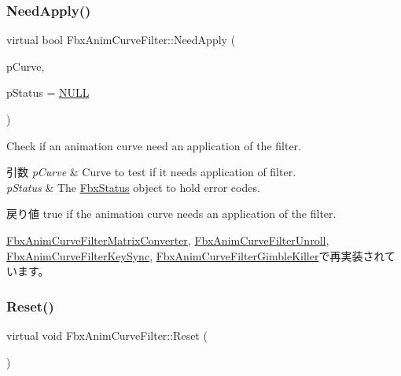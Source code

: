 \subsubsection{\texorpdfstring{Need\+Apply()}{NeedApply()}\hspace{0.1cm}{\footnotesize\ttfamily [5/5]}}
{\footnotesize\ttfamily virtual bool Fbx\+Anim\+Curve\+Filter\+::\+Need\+Apply (\begin{DoxyParamCaption}\item[{\hyperlink{class_fbx_anim_curve}{Fbx\+Anim\+Curve} \&}]{p\+Curve,  }\item[{\hyperlink{class_fbx_status}{Fbx\+Status} $\ast$}]{p\+Status = {\ttfamily \hyperlink{fbxarch_8h_a070d2ce7b6bb7e5c05602aa8c308d0c4}{N\+U\+LL}} }\end{DoxyParamCaption})\hspace{0.3cm}{\ttfamily [virtual]}}

Check if an animation curve need an application of the filter. 
\begin{DoxyParams}{引数}
{\em p\+Curve} & Curve to test if it needs application of filter. \\
\hline
{\em p\+Status} & The \hyperlink{class_fbx_status}{Fbx\+Status} object to hold error codes. \\
\hline
\end{DoxyParams}
\begin{DoxyReturn}{戻り値}
{\ttfamily true} if the animation curve needs an application of the filter. 
\end{DoxyReturn}


\hyperlink{class_fbx_anim_curve_filter_matrix_converter_aa7105a07dbaf0d9598fa930ff2b3141d}{Fbx\+Anim\+Curve\+Filter\+Matrix\+Converter}, \hyperlink{class_fbx_anim_curve_filter_unroll_adbe1626e507eb312b994b38403a11a19}{Fbx\+Anim\+Curve\+Filter\+Unroll}, \hyperlink{class_fbx_anim_curve_filter_key_sync_a5f255ee33fe2ecad8c61562931840c01}{Fbx\+Anim\+Curve\+Filter\+Key\+Sync}, \hyperlink{class_fbx_anim_curve_filter_gimble_killer_a136dadcee53ebed6b5afc6abddfcf402}{Fbx\+Anim\+Curve\+Filter\+Gimble\+Killer}で再実装されています。

\mbox{\label{class_fbx_anim_curve_filter_a57fb35baaaa85adb08946383cf40e811}} 
\subsubsection{\texorpdfstring{Reset()}{Reset()}}
{\footnotesize\ttfamily virtual void Fbx\+Anim\+Curve\+Filter\+::\+Reset (\begin{DoxyParamCaption}{ }\end{DoxyParamCaption})\hspace{0.3cm}{\ttfamily [virtual]}}


